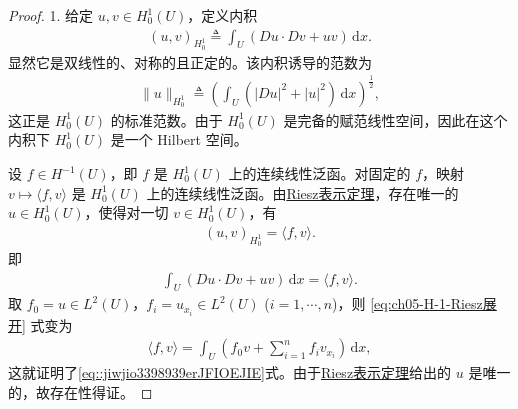 \documentclass[../../main.tex]{subfiles}
\begin{document}
\begin{proof}

1.
给定 $u,v\in H^{1}_{0}(U)$，定义内积
\begin{align*}
(u,v)_{H_0^1}\triangleq\int_{U}(Du\cdot Dv+uv)\,\mathrm{d}x.
\end{align*}
显然它是双线性的、对称的且正定的。该内积诱导的范数为
\begin{align*}
\|u\|_{H_0^1}\triangleq\left(\int_U(|Du|^2+|u|^2)\,\mathrm{d}x\right)^{\frac{1}{2}},
\end{align*}
这正是 $H_0^1(U)$ 的标准范数。由于 $H_0^1(U)$ 是完备的赋范线性空间，因此在这个内积下 $H_0^1(U)$ 是一个 Hilbert 空间。

设 $f\in H^{-1}(U)$，即 $f$ 是 $H_0^1(U)$ 上的连续线性泛函。对固定的 $f$，映射 $v\mapsto \langle f,v\rangle$ 是 $H_0^1(U)$ 上的连续线性泛函。由\hyperref[Functional Analysis-theorem:Riesz表示定理(Hilbert空间)]{Riesz表示定理}，存在唯一的 $u\in H_0^1(U)$，使得对一切 $v\in H_0^1(U)$，有
\begin{align}\label{eq:ch05-H-1-Riesz}
(u,v)_{H_0^1}=\langle f,v\rangle.
\end{align}
即
\begin{align}\label{eq:ch05-H-1-Riesz展开}
\int_{U}(Du\cdot Dv+uv)\,\mathrm{d}x=\langle f,v\rangle.
\end{align}
取 $f_0=u\in L^2(U)$，$f_i=u_{x_i}\in L^2(U)$ ($i=1,\cdots,n$)，则 \eqref{eq:ch05-H-1-Riesz展开} 式变为
\begin{align*}
\langle f,v\rangle=\int_{U}(f_0v+\sum_{i=1}^{n}f_iv_{x_i})\,\mathrm{d}x,
\end{align*}
这就证明了\eqref{eq::jiwjio3398939erJFIOEJIE}式。由于\hyperref[Functional Analysis-theorem:Riesz表示定理(Hilbert空间)]{Riesz表示定理}给出的 $u$ 是唯一的，故存在性得证。


\end{proof}
\end{document}
